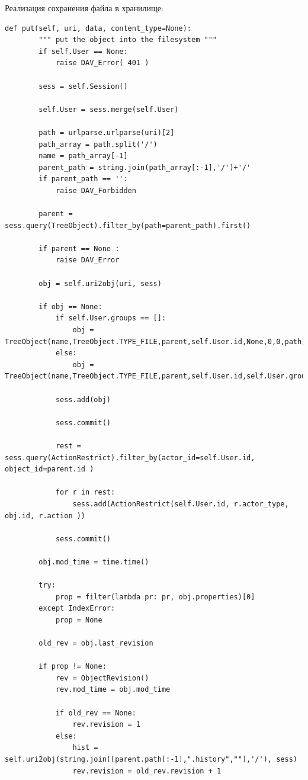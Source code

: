 \documentclass[utf8,usehyperref,12pt]{G7-32}
\begin{document}
Реализация сохранения файла в хранилище:
\begin{verbatim}
def put(self, uri, data, content_type=None):
        """ put the object into the filesystem """
        if self.User == None:
            raise DAV_Error( 401 )
        
        sess = self.Session()
        
        self.User = sess.merge(self.User)
        
        path = urlparse.urlparse(uri)[2]
        path_array = path.split('/')
        name = path_array[-1]
        parent_path = string.join(path_array[:-1],'/')+'/'
        if parent_path == '':            
            raise DAV_Forbidden
        
        parent = sess.query(TreeObject).filter_by(path=parent_path).first()

        if parent == None :
            raise DAV_Error

        obj = self.uri2obj(uri, sess)
        
        if obj == None:
            if self.User.groups == []:
                obj = TreeObject(name,TreeObject.TYPE_FILE,parent,self.User.id,None,0,0,path)
            else:                
                obj = TreeObject(name,TreeObject.TYPE_FILE,parent,self.User.id,self.User.groups[0].id,0,0,path)
        
            sess.add(obj)
            
            sess.commit()
            
            rest = sess.query(ActionRestrict).filter_by(actor_id=self.User.id, object_id=parent.id )
            
            for r in rest:
                sess.add(ActionRestrict(self.User.id, r.actor_type, obj.id, r.action ))
                
            sess.commit()
        
        obj.mod_time = time.time()
        
        try:
            prop = filter(lambda pr: pr, obj.properties)[0]            
        except IndexError:
            prop = None
        
        old_rev = obj.last_revision
        
        if prop != None:
            rev = ObjectRevision()
            rev.mod_time = obj.mod_time
        
            if old_rev == None:
                rev.revision = 1            
            else:
                hist = self.uri2obj(string.join([parent.path[:-1],".history",""],'/'), sess)
                rev.revision = old_rev.revision + 1           
                

\end{verbatim}
\end{document}
